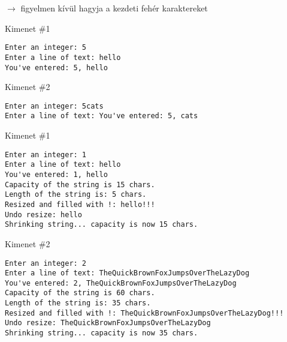 \begin{frame}[fragile]
     $\to$ figyelmen kívül hagyja a kezdeti fehér karaktereket
    \begin{block}{Kimenet \#1}
        \vspace{-.4cm}
        \begin{verbatim}
Enter an integer: 5
Enter a line of text: hello
You've entered: 5, hello            
\end{verbatim}
        \vspace{-.3cm}
    \end{block}
    \begin{block}{Kimenet \#2}
        \vspace{-.4cm}
        \begin{verbatim}
Enter an integer: 5cats
Enter a line of text: You've entered: 5, cats
\end{verbatim}
\vspace{-.3cm}
    \end{block}
\end{frame}

\begin{frame}
    \begin{exampleblock}{}
        \footnotesize
        
    \end{exampleblock}
\end{frame}

\begin{frame}[fragile]
    \begin{block}{Kimenet \#1}
        \vspace{-.4cm}
        \begin{verbatim}
Enter an integer: 1
Enter a line of text: hello
You've entered: 1, hello
Capacity of the string is 15 chars.
Length of the string is: 5 chars.
Resized and filled with !: hello!!!
Undo resize: hello
Shrinking string... capacity is now 15 chars.        
\end{verbatim}
        \vspace{-.3cm}
    \end{block}
\end{frame}

\begin{frame}[fragile]
    \begin{block}{Kimenet \#2}
        \vspace{-.4cm}
        \begin{verbatim}
Enter an integer: 2
Enter a line of text: TheQuickBrownFoxJumpsOverTheLazyDog
You've entered: 2, TheQuickBrownFoxJumpsOverTheLazyDog
Capacity of the string is 60 chars.
Length of the string is: 35 chars.
Resized and filled with !: TheQuickBrownFoxJumpsOverTheLazyDog!!!
Undo resize: TheQuickBrownFoxJumpsOverTheLazyDog
Shrinking string... capacity is now 35 chars.
\end{verbatim}
        \vspace{-.3cm}
    \end{block}
\end{frame}

